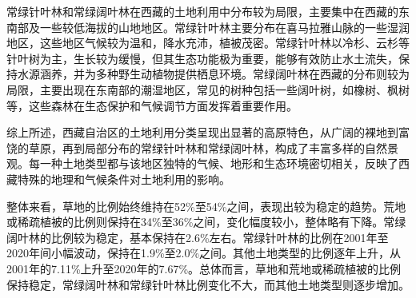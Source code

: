 \documentclass{article}
\begin{document}
		常绿针叶林和常绿阔叶林在西藏的土地利用中分布较为局限，主要集中在西藏的东南部及一些较低海拔的山地地区。常绿针叶林主要分布在喜马拉雅山脉的一些湿润地区，这些地区气候较为温和，降水充沛，植被茂密。常绿针叶林以冷杉、云杉等针叶树为主，生长较为缓慢，但其生态功能极为重要，能够有效防止水土流失，保持水源涵养，并为多种野生动植物提供栖息环境。常绿阔叶林在西藏的分布则较为局限，主要出现在东南部的潮湿地区，常见的树种包括一些阔叶树，如橡树、枫树等，这些森林在生态保护和气候调节方面发挥着重要作用。
		
		综上所述，西藏自治区的土地利用分类呈现出显著的高原特色，从广阔的裸地到富饶的草原，再到局部分布的常绿针叶林和常绿阔叶林，构成了丰富多样的自然景观。每一种土地类型都与该地区独特的气候、地形和生态环境密切相关，反映了西藏特殊的地理和气候条件对土地利用的影响。
		
		
		整体来看，草地的比例始终维持在52\%至54\%之间，表现出较为稳定的趋势。荒地或稀疏植被的比例则保持在34\%至36\%之间，变化幅度较小，整体略有下降。常绿阔叶林的比例较为稳定，基本保持在2.6\%左右。常绿针叶林的比例在2001年至2020年间小幅波动，保持在1.9\%至2.0\%之间。其他土地类型的比例逐年上升，从2001年的7.11\%上升至2020年的7.67\%。总体而言，草地和荒地或稀疏植被的比例保持稳定，常绿阔叶林和常绿针叶林比例变化不大，而其他土地类型则逐步增加。
		
\end{document}
